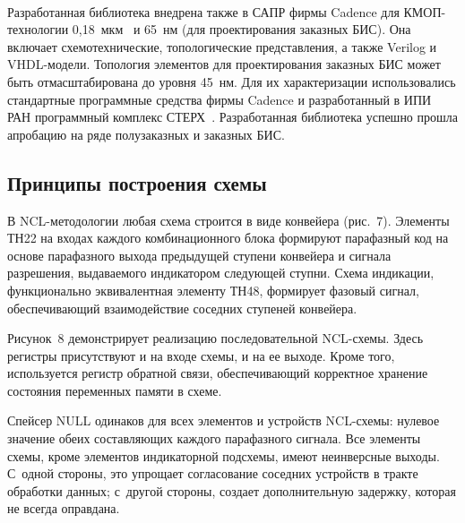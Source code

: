 \begin{multicols}{2}
\begin{figure*}[b] %
              \begin{center}
 \mbox{%
 \epsfxsize=159.299mm
 }
 \end{center}
 \vspace*{-9pt}
\end{figure*}
       
       Разработанная библиотека внедрена также в САПР фирмы Cadence для 
       КМОП-тех\-но\-ло\-гии 0,18~мкм~\cite{73-sok} и 65~нм (для проектирования 
заказных БИС). Она включает схемотехнические, топологические представления, а также 
Verilog и VHDL-мо\-де\-ли. Топология элементов для проектирования заказных БИС может 
быть отмасштабирована до уровня 45~нм. Для их характеризации использовались 
стандартные программные средства фирмы Cadence и разработанный в ИПИ РАН 
про\-грам\-мный комплекс СТЕРХ~\cite{74-sok}. Разработанная биб\-ли\-о\-те\-ка успешно прошла 
апробацию на ряде полузаказных и заказных БИС.

\vspace*{-3pt} 

       \subsection{Принципы построения схемы}
       
       \vspace*{-1pt}
       
       В NCL-методологии любая схема строится в виде конвейера (рис.~7). Элементы 
ТН22 на входах каждого комбинационного блока формируют парафазный код на основе 
парафазного выхода предыду\-щей ступени конвейера и сигнала разрешения, выдаваемого 
индикатором следующей ступни. Схема индикации, функционально эквивалентная элементу 
ТН48, формирует фазовый сигнал, обеспечивающий взаимодействие соседних ступеней 
конвейера.
       
       Рисунок~8 демонстрирует реализацию последовательной NCL-схе\-мы. Здесь 
регистры присутствуют и на входе схемы, и на ее выходе. Кроме того, используется регистр 
обратной связи, обеспечивающий корректное хранение состояния переменных памяти в 
схеме.
       
       Спейсер NULL одинаков для всех элементов и устройств NCL-схе\-мы: нулевое 
значение обеих составляющих каждого парафазного сигнала. Все элементы схемы, кроме 
элементов индикаторной подсхемы, имеют неинверсные выходы. С~одной стороны, это 
упрощает согласование соседних устройств в тракте обработки данных; с~другой стороны, 
создает дополнительную задержку, которая не всегда оправдана.


\end{multicols}
